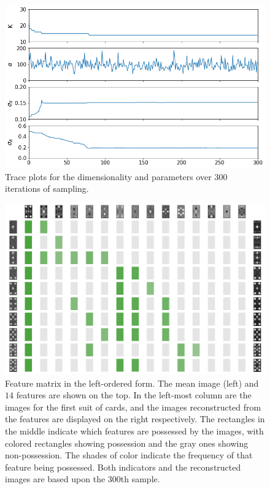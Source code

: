 \documentclass{article}
\begin{document}
\begin{figure}[!h]
  \centering
  \includegraphics[width = \textwidth]{figures/gibbsresult.png}
  \caption{Trace plots for the dimensionality and parameters over $300$ iterations of sampling.}
  \label{fig::gibbs}
\end{figure}

\begin{figure}[!h]
  \centering
  \includegraphics[width = \textwidth]{figures/featuremap.png} 
  \caption{Feature matrix in the left-ordered form. The mean image (left) and $14$ features are shown on the top. In the left-most column are the images for the first suit of cards, and the images reconstructed from the features are displayed on the right respectively. The rectangles in the middle indicate which features are possessed by the images, with colored rectangles showing possession and the gray ones showing non-possession. The shades of color indicate the frequency of that feature being possessed. Both indicators and the reconstructed images are based upon the 300th sample.}
  \label{fig::featuremap}
\end{figure}
\end{document}

